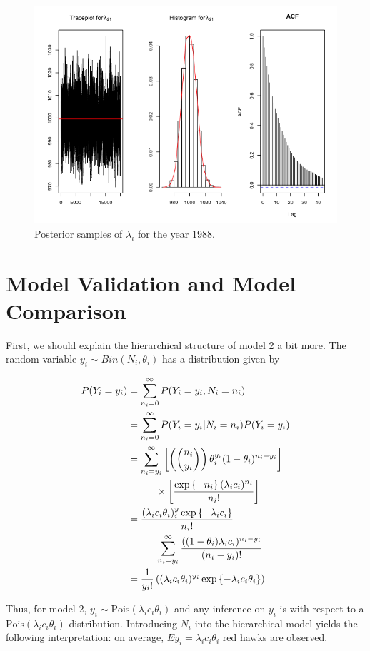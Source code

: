\documentclass{asaproc}
\newcommand{\Capyi}{Y_i}
\newcommand{\Yequalsy}{\Capyi = \yi}
\newcommand{\lcni}{n_i}
\newcommand{\sumyiO}{\sum_{\lcni = 0} ^ \infty}
\newcommand{\sumyiNi}{\sum_{\lcni=\yi} ^ \infty}
\newcommand{\yi}{y_i}
\newcommand{\squarebk}[1]{\left[#1\right]}
\newcommand{\parenth}[1]{\left(#1\right)}
\newcommand{\curlies}[1]{ \left\{#1\right\} }
\newcommand\tab[1][1cm]{\hspace*{#1}}
\newcommand{\Pois}{\text{Pois}}
\newcommand{\lami}{\lambda_i}
\newcommand{\theti}{\theta_i}
\newcommand{\ci}{c_i}
\newcommand{\Ni}{N_i}
\begin{document}
\begin{figure}[h!]
    \centering
    \includegraphics[scale = 0.35]{lam21.png}
    \caption{Posterior samples of $\lami$ for the year 1988.}
    \label{lam21}
\end{figure}

\clearpage
\section{Model Validation and Model Comparison}
First, we should explain the hierarchical structure of model 2 a bit more. The random variable $y_i\sim Bin(N_i,\theti)$ has a distribution given by

\begin{align}
    P(\Yequalsy) &= \sumyiO P(\Yequalsy, \Ni = \lcni)\\
    &= \sumyiO P(\Yequalsy|\Ni = \lcni)P(\Yequalsy) \\
    &= \sumyiNi \squarebk{\parenth{\lcni \choose \yi} \theti^{\yi} (1-\theti)^{\lcni - \yi} }\\
    &\tab \times \squarebk{\frac{\exp\curlies{-\lcni} (\lami\ci)^{\lcni}}{\lcni!}}\\
    &= \frac{(\lami\ci\theti)^\yi \exp\curlies{-\lami\ci}}{\lcni!}\\
    & \tab \sumyiNi \frac{((1-\theti)\lami\ci)^{\lcni-\yi}}{(\lcni - \yi)!}\\
    & =\frac{1}{\yi!}\parenth{(\lami\ci\theti)^{\yi} \exp\curlies{-\lami\ci\theti} }
\end{align}

Thus, for model 2, $y_i \sim \Pois(\lami \ci\theti)$ and any inference on $\yi$ is with respect to a $\Pois(\lami\ci\theti)$ distribution. Introducing $\Ni$ into the hierarchical model yields the following interpretation:  on average, $E\yi = \lami\ci\theti$ red hawks are observed.
\end{document}
